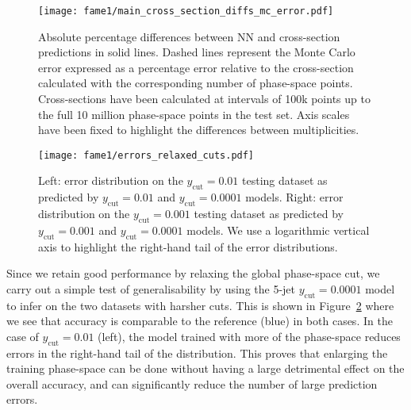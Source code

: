 \documentclass[main.tex]{subfiles}
\begin{document}
\begin{figure}
    \centering
    \texttt{[image: fame1/main\_cross\_section\_diffs\_mc\_error.pdf]}
    \caption{Absolute percentage differences between NN and {\NJet} cross-section predictions in solid lines.
    Dashed lines represent the Monte Carlo error expressed as a percentage error relative to the {\NJet} cross-section calculated with the corresponding number of phase-space points.
    Cross-sections have been calculated at intervals of 100k points up to the full 10 million phase-space points in the test set.
    Axis scales have been fixed to highlight the differences between multiplicities.}
    \label{fig:cross_section_diffs}
\end{figure}

\begin{figure}
    \centering
    \texttt{[image: fame1/errors\_relaxed\_cuts.pdf]}
    \caption{Left: error distribution on the $y_{\mathrm{cut}} = 0.01$ testing dataset as predicted by $y_{\mathrm{cut}} = 0.01$ and $y_{\mathrm{cut}} = 0.0001$ models.
    Right: error distribution on the $y_{\mathrm{cut}} = 0.001$ testing dataset as predicted by $y_{\mathrm{cut}} = 0.001$ and $y_{\mathrm{cut}} = 0.0001$ models.
    We use a logarithmic vertical axis to highlight the right-hand tail of the error distributions.}
    \label{fig:errors_relaxed_cuts}
\end{figure}
Since we retain good performance by relaxing the global phase-space cut, 
we carry out a simple test of generalisability by using the 5-jet $y_{\mathrm{cut}} = 0.0001$ model to infer on the two datasets with harsher cuts.
This is shown in Figure~\ref{fig:errors_relaxed_cuts} where we see that accuracy is comparable to the reference (blue) in both cases.
In the case of $y_{\mathrm{cut}} = 0.01$ (left), the model trained with more of the phase-space reduces errors in the right-hand tail of the distribution. 
This proves that enlarging the training phase-space can be done without having a large detrimental effect on the overall accuracy, and can significantly reduce the number of
large prediction errors. 
\end{document}
